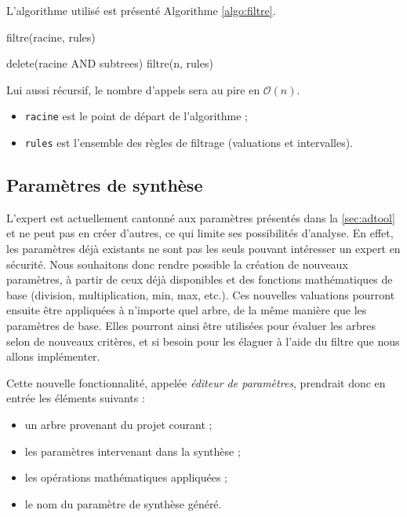 		L'algorithme utilisé est présenté Algorithme \ref{algo:filtre}. 
		\begin{algorithm}[h!]
			\caption{filtre(racine, rules)}
			\label{algo:filtre}
			\begin{algorithmic}
						\STATE delete(racine AND subtrees)
						\RETURN
					\ENDIF
				\ENDFOR
				\STATE
					\STATE filtre(n, rules)
				\ENDFOR
			\end{algorithmic}
		\end{algorithm}
		Lui aussi récursif, le nombre d'appels sera au pire en $\mathcal{O}(n)$.
		\begin{itemize}
			\item \verb|racine| est le point de départ de l'algorithme ;
			\item \verb|rules| est l'ensemble des règles de filtrage (valuations et intervalles).
		\end{itemize}
	

		\subsection{Paramètres de synthèse}
			\label{subsection:synthese} 

			L'expert est actuellement cantonné aux paramètres présentés dans la {} \ref{sec:adtool} et ne peut pas en créer d'autres, ce qui limite ses possibilités d'analyse. En effet, les paramètres déjà existants ne sont pas les seuls pouvant intéresser un expert en sécurité. Nous souhaitons donc rendre possible la création de nouveaux paramètres, à partir de ceux déjà disponibles et des fonctions mathématiques de base (division, multiplication, min, max, etc.). Ces nouvelles valuations pourront ensuite être appliquées à n'importe quel arbre, de la même manière que les paramètres de base. Elles pourront ainsi être utilisées pour évaluer les arbres selon de nouveaux critères, et si besoin pour les élaguer à l'aide du filtre que nous allons implémenter.

			Cette nouvelle fonctionnalité, appelée \emph{éditeur de paramètres}, prendrait donc en entrée les éléments suivants :
			\begin{itemize}
				\item un arbre provenant du projet courant ;
				\item les paramètres intervenant dans la synthèse ;
				\item les opérations mathématiques appliquées ;
				\item le nom du paramètre de synthèse généré.
			\end{itemize}

